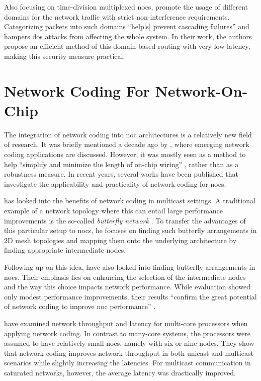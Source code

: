 Also focusing on time-division multiplexed \glspl{noc}, \citeauthor{wassel13surfnoc} \cite{wassel13surfnoc} promote the usage of different domains for
the network traffic with strict non-interference requirements. Categorizing packets into such domains \enquote{help[s] prevent cascading failures}
\cite[1]{wassel13surfnoc} and hampers \gls{dos} attacks from affecting the whole system. In their work, the authors propose an efficient method of
this domain-based routing with very low latency, making this security measure practical.

\section{Network Coding For Network-On-Chip}\label{sec:ncfornoc}
The integration of network coding into \gls{noc} architectures is a relatively new field of research. It was briefly mentioned a decade ago by
\citeauthor{fragouli08ncapplications} \cite{fragouli08ncapplications}, where emerging network coding applications are discussed. However, it was
mostly seen as a method to help \enquote{simplify and minimize the length of on-chip wiring} \cite[260]{fragouli08ncapplications}, rather than as a
robustness measure. In recent years, several works have been published that investigate the applicability and practicality of network coding for
\glspl{noc}.

\citeauthor{indrusiak11ncfornocs} \cite{indrusiak11ncfornocs} has looked into the benefits of network coding in multicast settings. A traditional
example of a network topology where this can entail large performance improvements is the so-called \textit{butterfly network} \cites(cf.)(){ahlswede00networkflow}{li03linearnc}.
To transfer the advantages of this particular setup to \glspl{noc}, he focuses on finding such butterfly arrangements in 2D mesh topologies and
mapping them onto the underlying architecture by finding appropriate intermediate nodes.

Following up on this idea, \citeauthor{shalaby12nodeselection} \cite{shalaby12nodeselection} have also looked into finding butterfly arrangements in
\glspl{noc}. Their emphasis lies on enhancing the selection of the intermediate nodes and the way this choice impacts network performance. While
evaluation showed only modest performance improvements, their results \enquote{confirm the great potential of network coding to improve \gls{noc}
performance} \cite[5]{shalaby12nodeselection}.

\citeauthor{duongba11ncinmulticore} \cite{duongba11ncinmulticore} have examined network throughput and latency for multi-core processors when applying
network coding. In contrast to many-core systems, the processors were assumed to have relatively small \glspl{noc}, namely with six or nine nodes.
They show that network coding improves network throughput in both unicast and multicast scenarios while slightly increasing the latencies. For
multicast communication in saturated networks, however, the average latency was drastically improved.

